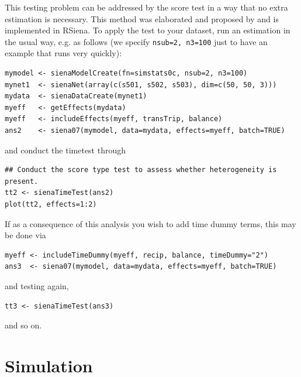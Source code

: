 \documentclass[a4paper,fleqn,11pt]{article}
\newcommand{\+}{\, + \,}
\begin{document}
This testing problem can be addressed by the score test in a way that
no extra estimation is necessary. This method was elaborated and proposed by
\citet{Lospinoso2011} and is implemented in RSiena.  To apply the
test to your dataset, run an estimation in the usual way, e.g. as follows
(we specify \texttt{nsub=2, n3=100} just to have an example that runs
very quickly):
\begin{verbatim}
mymodel <- sienaModelCreate(fn=simstats0c, nsub=2, n3=100)
mynet1  <- sienaNet(array(c(s501, s502, s503), dim=c(50, 50, 3)))
mydata  <- sienaDataCreate(mynet1)
myeff   <- getEffects(mydata)
myeff   <- includeEffects(myeff, transTrip, balance)
ans2    <- siena07(mymodel, data=mydata, effects=myeff, batch=TRUE)
\end{verbatim}
and conduct the timetest through
\begin{verbatim}
## Conduct the score type test to assess whether heterogeneity is present.
tt2 <- sienaTimeTest(ans2)
plot(tt2, effects=1:2)
\end{verbatim}
If as a consequence of this analysis you wish to add time dummy terms,
this may be done via
\begin{verbatim}
myeff <- includeTimeDummy(myeff, recip, balance, timeDummy="2")
ans3  <- siena07(mymodel, data=mydata, effects=myeff, batch=TRUE)
\end{verbatim}
and testing again,
\begin{verbatim}
tt3 <- sienaTimeTest(ans3)
\end{verbatim}
and so on.



\newpage
\section{Simulation}
\end{document}
